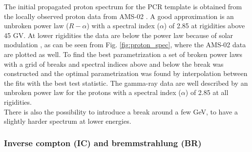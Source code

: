 The initial propagated proton spectrum for the PCR template is obtained from the locally observed proton data from AMS-02 . A good approximation is an unbroken power law ($R-\alpha$) with a spectral index ($\alpha$) of 2.85 at rigidities above 45 GV. At lower rigidities the data are below the power law because of solar modulation , as can be seen from Fig. \ref{fig:proton_spec}, where the AMS-02 data are plotted as well. To find the best parametrization a set of broken power laws with a grid of breaks and spectral indices above and below the break was constructed and the optimal parametrization was found by interpolation between the fits with the best test statistic. 
The gamma-ray data are well described by an unbroken power law for the protons with a spectral index ($\alpha$) of 2.85 at all rigidities.\\

There is also the possibility to introduce a break around a few GeV, to have a slightly harder spectrum at lower energies.\\


\subsubsection{Inverse compton (IC) and bremmstrahlung (BR)}

